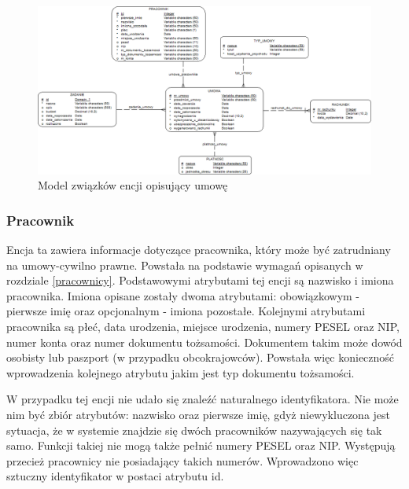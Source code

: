 \begin{figure}[]
    \begin{center}
	\includegraphics[scale=.8,angle=-90]{img/logiczny3.png}
	\caption{Model związków encji opisujący umowę}
	\label{logiczny3}
    \end{center}
\end{figure}

\subsubsection{Pracownik}
Encja ta zawiera informacje dotyczące pracownika, który może być zatrudniany na umowy-cywilno prawne. Powstała na podstawie wymagań opisanych w rozdziale \ref{pracownicy}. Podstawowymi atrybutami tej encji są nazwisko i imiona pracownika. Imiona opisane zostały dwoma atrybutami: obowiązkowym - pierwsze imię oraz opcjonalnym - imiona pozostałe. Kolejnymi atrybutami pracownika są płeć, data urodzenia, miejsce urodzenia, numery PESEL oraz NIP, numer konta oraz numer dokumentu tożsamości. Dokumentem takim może dowód osobisty lub paszport  (w przypadku obcokrajowców). Powstała więc konieczność wprowadzenia kolejnego atrybutu jakim jest typ dokumentu tożsamości.

W przypadku tej encji nie udało się znaleźć naturalnego identyfikatora. Nie może nim być zbiór atrybutów: nazwisko oraz pierwsze imię, gdyż niewykluczona jest sytuacja, że w systemie znajdzie się dwóch pracowników nazywających się tak samo. Funkcji takiej nie mogą także pełnić numery PESEL oraz NIP. Występują przecież pracownicy nie posiadający takich numerów. Wprowadzono więc sztuczny identyfikator w postaci atrybutu id.

